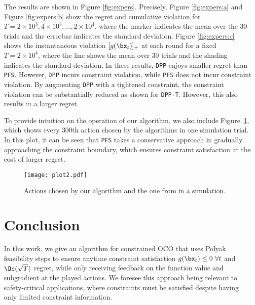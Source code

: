 The results are shown in Figure \ref{fig:expers}.
Precisely, Figure \ref{fig:expers:a} and Figure \ref{fig:expers:b} show the regret and cumulative violation for $T = 2 \times 10^3,4 \times 10^3,...,2 \times 10^4$, where the marker indicates the mean over the $30$ trials and the errorbar indicates the standard deviation.
Figure \ref{fig:expers:c} shows the instantaneous violation $[g(\bx_t)]_+$ at each round for a fixed $T = 2 \times 10^4$, where the line shows the mean over $30$ trials and the shading indicates the standard deviation.
In these results, \texttt{DPP} enjoys smaller regret than \texttt{PFS}.
However, \texttt{DPP} incurs constraint violation, while \texttt{PFS} does not incur constraint violation.
By augmenting \texttt{DPP} with a tightened constraint, the constraint violation can be substantially reduced as shown for \texttt{DPP-T}.
However, this also results in a larger regret.

To provide intuition on the operation of our algorithm, we also include Figure~\ref{fig:examp}, which shows every $300$th action chosen by the algorithms in one simulation trial.
In this plot, it can be seen that \texttt{PFS} takes a conservative approach in gradually approaching the constraint boundary, which ensures constraint satisfaction at the cost of larger regret.


\begin{figure}[t]
    \centering    
    \texttt{[image: plot2.pdf]}
    \vspace{-0.2in}
   \caption{Actions chosen by our algorithm and the one from \citet{yu2017online} in a simulation.}
   \label{fig:examp}
   \vspace{-0.1in}
\end{figure}

\section{Conclusion}

In this work, we give an algorithm for constrained OCO that uses Polyak feasibility steps to ensure anytime constraint satisfaction $g(\bx_t) \leq 0\ \forall t$ and $\Oc(\sqrt{T})$ regret, while only receiving feedback on the function value and subgradient at the played actions.
We foresee this approach being relevant to safety-critical applications, where constraints must be satisfied despite having only limited constraint information.



